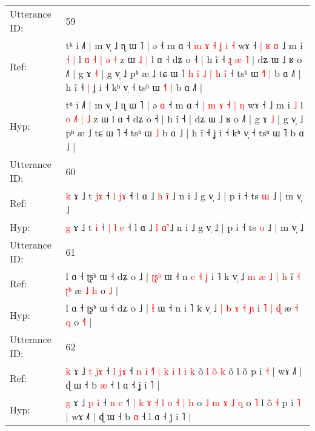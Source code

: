 \documentclass[10pt]{article}
\DeclareRobustCommand{\hl}[1]{{\textcolor{red}{#1}}}
\begin{document}
\begin{longtable}{ll}
 \\
\midrule
Utterance ID: & 59 \\
Ref: & tʰ i ˩˥ | m v̩ ˩ ɳ ɯ ˥ | ə\hl{}\hl{} ˧ m ɑ ˧ \hl{m} \hl{ɤ} \hl{˧} \hl{ʝ} \hl{i} \hl{˧} wɤ ˧\hl{ }\hl{|}\hl{ }\hl{ʁ}\hl{ }\hl{ɑ} ˩ m i\hl{ }\hl{˧} \hl{|} l \hl{ɑ} \hl{˧}\hl{ }\hl{|} \hl{ə} \hl{˧} z ɯ\hl{ }\hl{˩}\hl{ }\hl{|} l ɑ ˧ dʑ o ˧ | h ĩ ˧\hl{ }\hl{ɻ}\hl{ }\hl{æ}\hl{ }\hl{˥} | dʑ ɯ ˩ ʁ o ˩˥ | g ɤ \hl{˧} | g v̩ ˩ pʰ æ ˩ tɕ ɯ ˥\hl{ }\hl{h}\hl{ }\hl{i}\hl{̃}\hl{ }\hl{˩}\hl{ }\hl{|}\hl{ }\hl{h}\hl{ }\hl{i}\hl{̃} ˧ tsʰ ɯ\hl{ }\hl{˧}\hl{˥} \hl{|} b ɑ ˩\hl{˥} | h ĩ ˧\hl{ }\hl{|} ʝ i ˧ kʰ v̩ ˧ tsʰ ɯ \hl{˧}˥\hl{ }\hl{|} b ɑ ˩\hl{˥} |
 \\
Hyp: & tʰ i ˩˥ | m v̩ ˩ ɳ ɯ ˥ | ə\hl{ }\hl{ɑ} ˧ m ɑ ˧ \hl{|} \hl{m} \hl{ɤ} \hl{˧} \hl{|} \hl{ŋ} wɤ ˧\hl{}\hl{}\hl{}\hl{}\hl{}\hl{} ˩ m i\hl{}\hl{} \hl{˩} l \hl{o} \hl{}\hl{˩}\hl{˥} \hl{|} \hl{˩} z ɯ\hl{}\hl{}\hl{}\hl{} l ɑ ˧ dʑ o ˧ | h ĩ ˧\hl{}\hl{}\hl{}\hl{}\hl{}\hl{} | dʑ ɯ ˩ ʁ o ˩˥ | g ɤ \hl{˩} | g v̩ ˩ pʰ æ ˩ tɕ ɯ ˥\hl{}\hl{}\hl{}\hl{}\hl{}\hl{}\hl{}\hl{}\hl{}\hl{}\hl{}\hl{}\hl{}\hl{} ˧ tsʰ ɯ\hl{}\hl{}\hl{} \hl{˩} b ɑ ˩\hl{} | h ĩ ˧\hl{}\hl{} ʝ i ˧ kʰ v̩ ˧ tsʰ ɯ \hl{}˥\hl{}\hl{} b ɑ ˩\hl{} |
 \\
\midrule
Utterance ID: & 60 \\
Ref: & \hl{k} ɤ ˩ t \hl{j}\hl{ɤ} ˧ \hl{l} \hl{}\hl{j}\hl{ɤ} ˧ l ɑ ˩ \hl{h} \hl{i}̃ ˩ n i ˩ g v̩ ˩ | p i ˧ ts \hl{ɯ} ˩ | m v̩ ˩
 \\
Hyp: & \hl{g} ɤ ˩ t \hl{}\hl{i} ˧ \hl{|} \hl{l}\hl{ }\hl{e} ˧ l ɑ ˩ \hl{l} \hl{ɑ}̃ ˩ n i ˩ g v̩ ˩ | p i ˧ ts \hl{o} ˩ | m v̩ ˩
 \\
\midrule
Utterance ID: & 61 \\
Ref: & l ɑ ˧ ʈʂʰ ɯ ˧ dʑ o ˩ | \hl{ʈ}\hl{ʂ}\hl{ʰ} ɯ ˧ n\hl{ }\hl{e}\hl{ }\hl{˧}\hl{ }\hl{ʝ} i ˥ k v̩ ˩ \hl{m} \hl{æ} \hl{˩} \hl{|} \hl{h} i\hl{̃} \hl{˧} \hl{}\hl{ʈ}\hl{ʰ} æ \hl{˩} \hl{h} o \hl{}\hl{˩} |
 \\
Hyp: & l ɑ ˧ ʈʂʰ ɯ ˧ dʑ o ˩ | \hl{}\hl{}\hl{ɬ} ɯ ˧ n\hl{}\hl{}\hl{}\hl{}\hl{}\hl{} i ˥ k v̩ ˩ \hl{|} \hl{b} \hl{ɤ} \hl{˧} \hl{ɲ} i\hl{} \hl{˥} \hl{|}\hl{ }\hl{ɖ} æ \hl{˧} \hl{q} o \hl{˧}\hl{˥} |
 \\
\midrule
Utterance ID: & 62 \\
Ref: & \hl{k} ɤ ˩ \hl{t} \hl{j}\hl{ɤ} ˧ \hl{l} \hl{j}\hl{ɤ} ˧\hl{} \hl{n} \hl{i} \hl{˧}\hl{˥} \hl{|} \hl{k} \hl{i} \hl{l} \hl{i} \hl{k} o\hl{}\hl{̃} \hl{l} \hl{}\hl{o}\hl{̃} \hl{k} o\hl{}\hl{̃} l õ\hl{}\hl{} p i \hl{˧} | wɤ ˩˥ | ɖ ɯ ˧ b \hl{æ} ˧ l ɑ ˧ ʝ i ˥ |
 \\
Hyp: & \hl{g} ɤ ˩ \hl{p} \hl{}\hl{i} ˧ \hl{n} \hl{}\hl{e} ˧\hl{˥} \hl{|} \hl{k} \hl{}\hl{ɤ} \hl{˧} \hl{l} \hl{o} \hl{˧} \hl{|} \hl{h} o\hl{ }\hl{˩} \hl{m} \hl{ɤ}\hl{ }\hl{˩} \hl{q} o\hl{ }\hl{˥} l õ\hl{ }\hl{˧} p i \hl{˥} | wɤ ˩˥ | ɖ ɯ ˧ b \hl{ɑ} ˧ l ɑ ˧ ʝ i ˥ |

\end{longtable}
\end{document}
